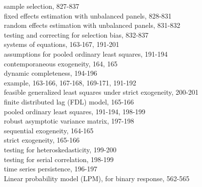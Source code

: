 \documentclass[10pt]{article}
\begin{document}
sample selection, 827-837\\
fixed effects estimation with unbalanced panels, 828-831\\
random effects estimation with unbalanced panels, 831-832\\
testing and correcting for selection bias, 832-837\\
systems of equations, 163-167, 191-201\\
assumptions for pooled ordinary least squares, 191-194\\
contemporaneous exogeneity, 164, 165\\
dynamic completeness, 194-196\\
example, 163-166, 167-168, 169-171, 191-192\\
feasible generalized least squares under strict exogeneity, 200-201\\
finite distributed lag (FDL) model, 165-166\\
pooled ordinary least squares, 191-194, 198-199\\
robust asymptotic variance matrix, 197-198\\
sequential exogeneity, 164-165\\
strict exogeneity, 165-166\\
testing for heteroskedasticity, 199-200\\
testing for serial correlation, 198-199\\
time series persistence, 196-197\\
Linear probability model (LPM), for binary response, 562-565
\end{document}
